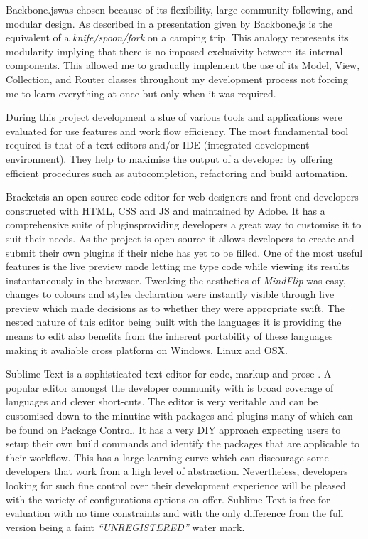 \documentclass[final]{cmpreport}
\begin{document}

Backbone.js\footnotemark was chosen because of its flexibility, large community following, and modular design. As described in a presentation given by \citet{Bull} Backbone.js is the equivalent of a \textit{knife/spoon/fork} on a camping trip. This analogy represents its modularity implying that there is no imposed exclusivity between its internal components. This allowed me to gradually implement the use of its Model, View, Collection, and Router classes throughout my development process not forcing me to learn everything at once but only when it was required.


During this project development a slue of various tools and applications were evaluated for use features and work flow efficiency. The most fundamental tool required is that of a text editors and/or IDE (integrated development environment). They help to maximise the output of a developer by offering efficient procedures such as autocompletion, refactoring and build automation.

Brackets\footnotemark[27] is an open source code editor for web designers and front-end developers constructed with HTML, CSS and JS and maintained by Adobe. It has a comprehensive suite of plugins\footnotemark[28] providing developers a great way to customise it to suit their needs. As the project is open source it allows developers to create and submit their own plugins if their niche has yet to be filled. One of the most useful features is the live preview mode letting me type code while viewing its results instantaneously in the browser. Tweaking the aesthetics of \textit{MindFlip} was easy, changes to colours and styles declaration were instantly visible through live preview which made decisions as to whether they were appropriate swift. The nested nature of this editor being built with the languages it is providing the means to edit also benefits from the inherent portability of these languages making it avaliable cross platform on Windows, Linux and OSX.


Sublime Text is a sophisticated text editor for code, markup and prose \footnotemark. A popular editor amongst the developer community with is broad coverage of languages and clever short-cuts. The editor is very veritable and can be customised down to the minutiae with packages and plugins many of which can be found on Package Control\footnotemark. It has a very DIY approach expecting users to setup their own build commands and identify the packages that are applicable to their workflow. This has a large learning curve which can discourage some developers that work from a high level of abstraction. Nevertheless, developers looking for such fine control over their development experience will be pleased with the variety of configurations options on offer. Sublime Text is free for evaluation with no time constraints and with the only difference from the full version being a faint \textit{``UNREGISTERED''} water mark.
\end{document}

